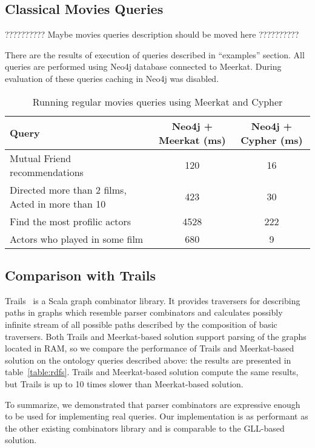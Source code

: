 \subsection{Classical Movies Queries}
?????????? Maybe movies queries description should be moved here ??????????

There are the results of execution of queries described in ``examples'' section.
All queries are performed using Neo4j database connected to Meerkat.
During evaluation of these queries caching in Neo4j was disabled.

\begin{table*}[t]
\centering
\begin{tabular}{|l|c|c|}
\hline
{Query} &
{Neo4j + Meerkat (ms)} &
{Neo4j + Cypher (ms)} \\
\hline
\hline
Mutual Friend recommendations & 120 & 16 \\
Directed more than 2 films, Acted in more than 10 & 423 & 30 \\
Find the most profilic actors & 4528 & 222 \\
Actors who played in some film & 680 & 9 \\
\hline
\end{tabular}
\caption{Running regular movies queries using Meerkat and Cypher}
\label{table:movies}
\end{table*}



\subsection{Comparison with Trails}

Trails~\cite{ScalaGraphParsing} is a Scala graph combinator library.
It provides traversers for describing paths in graphs which resemble parser combinators and calculates possibly infinite stream of all possible paths described by the composition of basic traversers.
Both Trails and Meerkat-based solution support parsing of the graphs located in RAM, so we compare the performance of Trails and Meerkat-based solution on the ontology queries described above: the results are presented in table~\ref{table:rdfs}.
Trails and Meerkat-based solution compute the same results, but Trails is up to 10 times slower than Meerkat-based solution.

To summarize, we demonstrated that parser combinators are expressive enough to be used for implementing real queries. 
Our implementation is as performant as the other existing combinators library and is comparable to the GLL-based solution.
